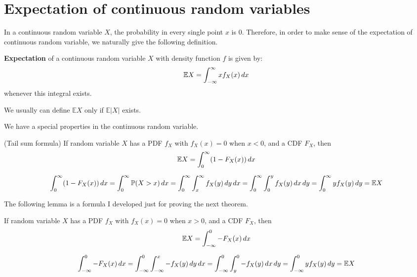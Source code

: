 \documentclass{huhtakm-template-book}
\newcommand{\prob}{\mathbb{P}}
\newcommand{\expect}{\mathbb{E}}
\begin{document}
\section{Expectation of continuous random variables}
    In a continuous random variable $X$, the probability in every single point $x$ is $0$. Therefore, in order to make sense of the expectation of continuous random variable, we naturally give the following definition.
    \begin{defn}
        \textbf{Expectation} of a continuous random variable $X$ with density function $f$ is given by:
        \begin{equation*}
            \expect X=\intinfty xf_{X}(x)\,dx
        \end{equation*}
        whenever this integral exists.
    \end{defn}
    \begin{rem}
        We usually can define $\expect X$ only if $\expect|X|$ exists.
    \end{rem}
    We have a special properties in the continuous random variable.
    \begin{lem}(Tail sum formula)
        \label{expectation as integral of additive inverse of cdf}
        If random variable $X$ has a PDF $f_{X}$ with $f_{X}(x)=0$ when $x<0$, and a CDF $F_{X}$, then
        \begin{equation*}
            \expect X=\intlu{0}{\infty}(1-F_{X}(x))\,dx
        \end{equation*}
    \end{lem}
    \begin{proofing}
        \begin{equation*}
            \intlu{0}{\infty}(1-F_{X}(x))\,dx=\intlu{0}{\infty}\prob(X>x)\,dx=\intlu{0}{\infty}\intlu{x}{\infty}f_{X}(y)\,dy\,dx=\intlu{0}{\infty}\intlu{0}{y}f_{X}(y)\,dx\,dy=\intlu{0}{\infty}yf_{X}(y)\,dy=\expect X
        \end{equation*}
    \end{proofing}
    The following lemma is a formula I developed just for proving the next theorem.
    \begin{lem}
        \label{expectation as integral of cdf}
        If random variable $X$ has a PDF $f_{X}$ with $f_{X}(x)=0$ when $x>0$, and a CDF $F_{X}$, then
        \begin{equation*}
            \expect X=\intlu{-\infty}{0}-F_{X}(x)\,dx
        \end{equation*}
    \end{lem}
    \begin{proofing}
        \begin{equation*}
            \intlu{-\infty}{0}-F_{X}(x)\,dx=\intlu{-\infty}{0}\intlu{-\infty}{x}-f_{X}(y)\,dy\,dx=\intlu{-\infty}{0}\intlu{y}{0}-f_{X}(y)\,dx\,dy=\intlu{-\infty}{0}yf_{X}(y)\,dy=\expect X
        \end{equation*}
    \end{proofing}
\end{document}
